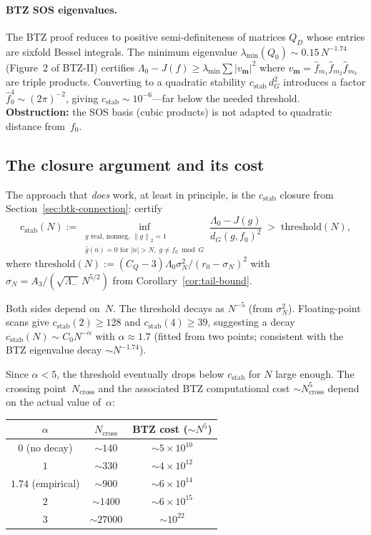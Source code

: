 \documentclass[12pt]{article}
\theoremstyle{definition}
\theoremstyle{remark}
\newcommand{\wh}{\widehat}
\newcommand{\norm}[1]{\left\|#1\right\|}
\begin{document}
\paragraph{BTZ SOS eigenvalues.}
The BTZ proof reduces to positive semi-definiteness of matrices $Q_D$
whose entries are sixfold Bessel integrals.  The minimum eigenvalue
$\lambda_{\min}(Q_0)\sim 0.15\,N^{-1.74}$ (Figure~2 of BTZ-II)
certifies $\Lambda_0-J(f)\geq\lambda_{\min}\sum|v_{\mathbf m}|^2$
where $v_{\mathbf m}=\wh f_{m_1}\wh f_{m_2}\wh f_{m_3}$ are
triple products.  Converting to a quadratic stability
$c_{\mathrm{stab}}\,d_G^2$ introduces a factor $\wh f_0^4\sim
(2\pi)^{-2}$, giving $c_{\mathrm{stab}}\sim 10^{-6}$---far
below the needed threshold.  \textbf{Obstruction:} the SOS basis
(cubic products) is not adapted to quadratic distance from~$f_0$.

\subsection{The closure argument and its cost}

The approach that \emph{does} work, at least in principle, is the
$c_{\mathrm{stab}}$ closure from
Section~\ref{sec:btk-connection}: certify
\[
  c_{\mathrm{stab}}(N)
  :=
  \inf_{\substack{g\text{ real, nonneg, }\norm{g}_2=1\\
  \wh g(n)=0\text{ for }|n|>N,\;g\neq f_0\bmod G}}
  \frac{\Lambda_0-J(g)}{d_G(g,f_0)^2}
  \;>\;
  \mathrm{threshold}(N),
\]
where $\mathrm{threshold}(N):=(C_Q-3)\Lambda_0\sigma_N^2/(r_0-\sigma_N)^2$
with $\sigma_N=A_3/(\sqrt{\Lambda_-}\,N^{5/2})$ from
Corollary~\ref{cor:tail-bound}.

Both sides depend on~$N$.  The threshold decays as $N^{-5}$
(from $\sigma_N^2$).  Floating-point scans give
$c_{\mathrm{stab}}(2)\geq 128$ and $c_{\mathrm{stab}}(4)\geq 39$,
suggesting a decay $c_{\mathrm{stab}}(N)\sim C_0 N^{-\alpha}$ with
$\alpha\approx 1.7$ (fitted from two points; consistent with the BTZ
eigenvalue decay $\sim N^{-1.74}$).

Since $\alpha<5$, the threshold eventually drops below
$c_{\mathrm{stab}}$ for $N$ large enough.  The crossing
point~$N_{\mathrm{cross}}$ and the associated BTZ computational cost
$\sim N_{\mathrm{cross}}^5$ depend on the actual value of~$\alpha$:

\begin{center}
\begin{tabular}{ccc}
\hline
$\alpha$ & $N_{\mathrm{cross}}$ & BTZ cost ($\sim N^5$) \\
\hline
$0$ (no decay) & $\sim 140$ & $\sim 5\times 10^{10}$ \\
$1$ & $\sim 330$ & $\sim 4\times 10^{12}$ \\
$1.74$ (empirical) & $\sim 900$ & $\sim 6\times 10^{14}$ \\
$2$ & $\sim 1400$ & $\sim 6\times 10^{15}$ \\
$3$ & $\sim 27000$ & $\sim 10^{22}$ \\
\hline
\end{tabular}
\end{center}
\end{document}
